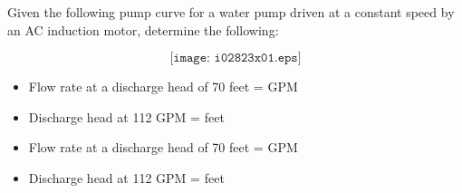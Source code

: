 

Given the following pump curve for a water pump driven at a constant speed by an AC induction motor, determine the following:

$$\texttt{[image: i02823x01.eps]}$$

\begin{itemize}
\item{} Flow rate at a discharge head of 70 feet = \underbar{\hskip 50pt} GPM
\vskip 5pt
\item{} Discharge head at 112 GPM = \underbar{\hskip 50pt} feet
\end{itemize}







\begin{itemize}
\item{} Flow rate at a discharge head of 70 feet =  GPM
\vskip 5pt
\item{} Discharge head at 112 GPM =  feet
\end{itemize}











